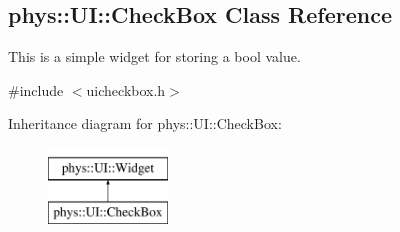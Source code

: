 \hypertarget{classphys_1_1UI_1_1CheckBox}{
\subsection{phys::UI::CheckBox Class Reference}
\label{dd/d10/classphys_1_1UI_1_1CheckBox}
}


This is a simple widget for storing a bool value.  




{\ttfamily \#include $<$uicheckbox.h$>$}

Inheritance diagram for phys::UI::CheckBox:\begin{figure}[H]
\begin{center}
\leavevmode
\includegraphics[height=2.000000cm]{dd/d10/classphys_1_1UI_1_1CheckBox}
\end{center}
\end{figure}
